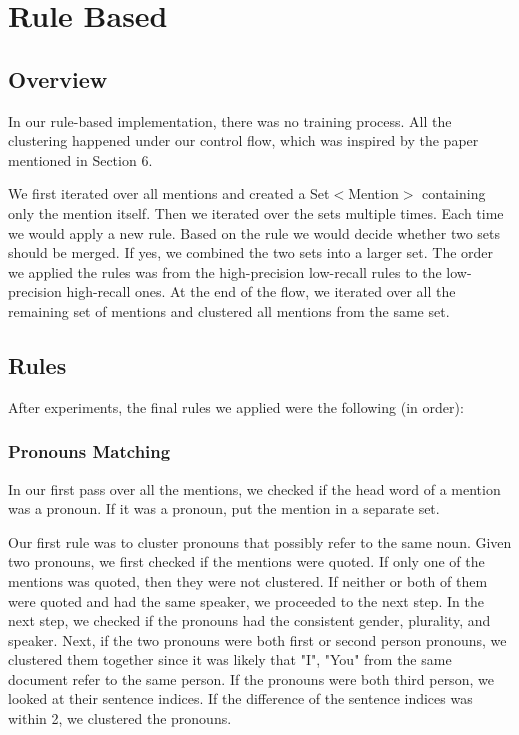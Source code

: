 \documentclass[12pt, twocolumn]{article}
\begin{document}
\section{Rule Based}
\subsection{Overview}
In our rule-based implementation, there was no training process. All the clustering happened under our control flow, which was inspired by the paper mentioned in Section 6.

We first iterated over all mentions and created a Set$<$Mention$>$ containing only the mention itself. Then we iterated over the sets multiple times. Each time we would apply a new rule. Based on the rule we would decide whether two sets should be merged. If yes, we combined the two sets into a larger set. The order we applied the rules was from the high-precision low-recall rules to the low-precision high-recall ones. 
At the end of the flow, we iterated over all the remaining set of mentions and clustered all mentions from the same set.

\subsection{Rules}
After experiments, the final rules we applied were the following (in order):

\subsubsection{Pronouns Matching}
In our first pass over all the mentions, we checked if the head word of a mention was a pronoun. If it was a pronoun, put the mention in a separate set.

Our first rule was to cluster pronouns that possibly refer to the same noun. Given two pronouns, we first checked if the mentions were quoted. If only one of the mentions was quoted, then they were not clustered. If neither or both of them were quoted and had the same speaker, we proceeded to the next step. In the next step, we checked if the pronouns had the consistent gender, plurality, and speaker. Next, if the two pronouns were both first or second person pronouns, we clustered them together since it was likely that "I", "You" from the same document refer to the same person. If the pronouns were both third person, we looked at their sentence indices. If the difference of the sentence indices was within 2, we clustered the pronouns.
\end{document}

